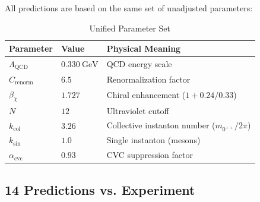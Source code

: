 \documentclass[12pt,a4paper]{amsart}
\theoremstyle{plain}
\theoremstyle{definition}
\theoremstyle{remark}
\DeclareMathOperator{\QCD}{QCD}
\begin{document}
All predictions are based on the same set of unadjusted parameters:

\begin{table}[h]
\centering
\caption{Unified Parameter Set}
\begin{tabular}{@{}lll@{}}
\toprule
Parameter & Value & Physical Meaning \\
\midrule
$\Lambda_{\QCD}$ & $0.330\ \text{GeV}$ & QCD energy scale \\
$C_{\text{renorm}}$ & $6.5$ & Renormalization factor \\
$\beta_{\chi}$ & $1.727$ & Chiral enhancement ($1+0.24/0.33$) \\
$N$ & $12$ & Ultraviolet cutoff \\
$k_{\text{col}}$ & $3.26$ & Collective instanton number ($m_{0^{++}}/2\pi$) \\
$k_{\text{sin}}$ & $1.0$ & Single instanton (mesons) \\
$\alpha_{\text{cvc}}$ & $0.93$ & CVC suppression factor \\
\bottomrule
\end{tabular}
\end{table}

\subsection{14 Predictions vs. Experiment}
\end{document}
